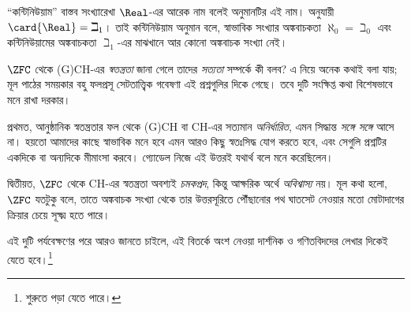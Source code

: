 \documentclass[../../../include/open-logic-section]{subfiles}
\begin{document}
``কন্টিনিউয়াম'' বাস্তব সংখ্যারেখা $\Real$-এর
আরেক নাম বলেই অনুমানটির এই নাম।
 অনুযায়ী
$\card{\Real}=\beth_1$। তাই কন্টিনিউয়াম অনুমান
বলে, স্বাভাবিক সংখ্যার অঙ্কবাচকতা
$\aleph_0=\beth_0$ এবং কন্টিনিউয়ামের অঙ্কবাচকতা
$\beth_1$-এর মাঝখানে আর কোনো অঙ্কবাচক সংখ্যা নেই।

$\ZFC$ থেকে (G)CH-এর \emph{স্বতন্ত্রতা} জানা গেলে
তাদের \emph{সত্যতা} সম্পর্কে কী বলব? এ নিয়ে
অনেক কথাই বলা যায়; মূল পাঠের সময়কার বহু
ফলপ্রসূ সেটতাত্ত্বিক গবেষণা এই প্রশ্নগুলির দিকে গেছে। তবে
দুটি সংক্ষিপ্ত কথা বিশেষভাবে মনে রাখা দরকার।

প্রথমত, আনুষ্ঠানিক স্বতন্ত্রতার ফল থেকে (G)CH বা
CH-এর সত্যমান \emph{অনির্ধারিত}, এমন সিদ্ধান্ত
\emph{সঙ্গে সঙ্গে} আসে না। হয়তো আমাদের কাছে
স্বাভাবিক মনে হবে এমন আরও কিছু স্বতঃসিদ্ধ যোগ
করতে হবে, এবং সেগুলি প্রশ্নটির একদিকে বা অন্যদিকে
মীমাংসা করবে। গ্যোডেল নিজে এই উত্তরই যথার্থ
বলে মনে করেছিলেন।

দ্বিতীয়ত, $\ZFC$ থেকে CH-এর স্বতন্ত্রতা অবশ্যই
\emph{চমকপ্রদ}, কিন্তু আক্ষরিক অর্থে \emph{অবিশ্বাস্য}
নয়। মূল কথা হলো, $\ZFC$ যতটুকু বলে, তাতে
অঙ্কবাচক সংখ্যা থেকে তার উত্তরসূরিতে পৌঁছানোর
পথ ঘাতসেট নেওয়ার মতো মোটাদাগের ক্রিয়ার চেয়ে
সূক্ষ্ম হতে পারে।

এই দুটি পর্যবেক্ষণের পরে আরও জানতে চাইলে,
এই বিতর্কে অংশ নেওয়া দার্শনিক ও গণিতবিদদের
লেখার দিকেই যেতে হবে।\footnote{শুরুতে
\citet[\S15.6]{Potter2004} পড়া যেতে পারে।}
\end{document}
